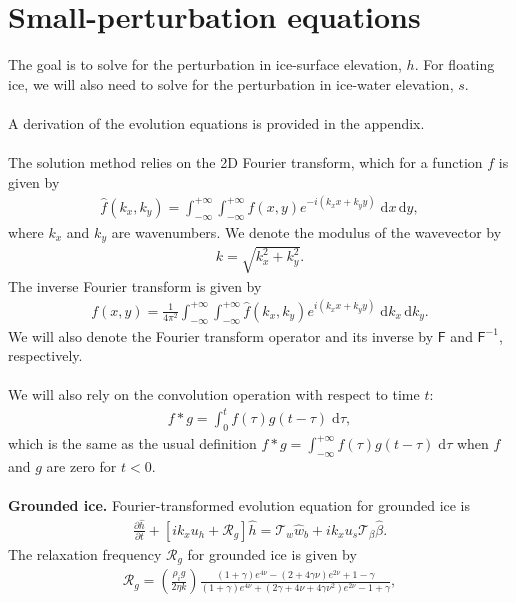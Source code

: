 \documentclass[paper=a4, fontsize=11pt]{article}
\begin{document}
\section*{Small-perturbation equations}
The goal is to solve for the perturbation in ice-surface elevation, $h$.
For floating ice, we will also need to solve for the perturbation
in ice-water elevation, $s$. \\ \\
A derivation of the evolution equations is provided in the appendix.
\\ \\
The solution method relies on the 2D Fourier transform, which for a function $f$
is given by
\begin{align}
\widehat{f}(k_x,k_y)  = \int_{-\infty}^{+\infty}\int_{-\infty}^{+\infty} f(x,y)e^{-i(k_x x + k_y y)} \; \mathrm{d}x\,\mathrm{d}y,
\end{align}
where $k_x$ and $k_y$ are wavenumbers. We denote the modulus of the wavevector by
\begin{align}
k = \sqrt{k_x^2 + k_y^2}.
\end{align}
The inverse Fourier transform is given by
\begin{align}
{f}(x,y) = \frac{1}{4\pi^2}\int_{-\infty}^{+\infty}\int_{-\infty}^{+\infty} \widehat{f}(k_x,k_y)e^{i(k_x x + k_y y)} \; \mathrm{d}k_x \, \mathrm{d}k_y.
\end{align}
We will also denote the Fourier transform operator and its inverse by $\mathsf{F}$ and
$\mathsf{F}^{-1}$, respectively.
\\ \\
We will also rely on the convolution operation with respect to time $t$:
\begin{align}
f*g = \int_0^t f(\tau)g(t-\tau)\;\mathrm{d}\tau,
\end{align}
which is the same as the usual definition $f*g = \int_{-\infty}^{+\infty} f(\tau)g(t-\tau)\;\mathrm{d}\tau$
when $f$ and $g$ are zero for $t<0$.
\\ \\
\textbf{Grounded ice.} Fourier-transformed evolution equation for grounded ice is
\begin{align}
\frac{\partial \widehat{h}}{\partial t}+ \left[ik_xu_h  + \mathcal{R}_g\right]\widehat{h} = \mathcal{T}_w\widehat{w}_b+ik_xu_s\mathcal{T}_{\beta} \widehat{\beta}.
\end{align}
The relaxation frequency $\mathcal{R}_g$ for grounded ice is given by
\begin{align}
\mathcal{R}_g = \left(\frac{\rho_i g }{2\eta k}\right)\frac{ (1+\gamma)e^{4\nu} -(2+4\gamma\nu)e^{2\nu} +1-\gamma  }{ (1+\gamma)e^{4\nu} + (2\gamma+4\nu+4\gamma\nu^2)e^{2\nu} -1 + \gamma  },
\end{align}
\end{document}
